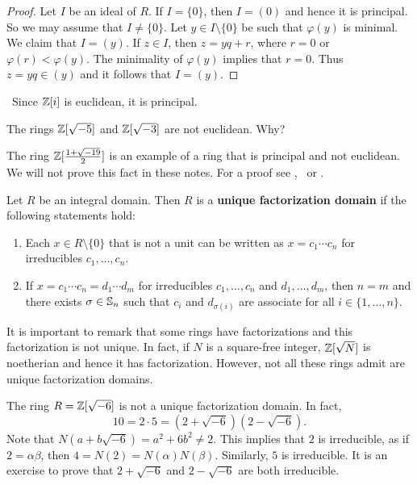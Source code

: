 \begin{proof}
	Let $I$ be an ideal of $R$. If $I=\{0\}$, then $I=(0)$ and hence 
	it is principal. So we may
	assume that $I\ne\{0\}$. Let $y\in I\setminus\{0\}$ be such that
	$\varphi(y)$ is minimal. We claim that $I=(y)$. 
	If $z\in I$, then $z=yq+r$, where $r=0$ or $\varphi(r)<\varphi(y)$. 
	The minimality of $\varphi(y)$ implies that $r=0$. Thus $z=yq\in (y)$ and 
	it follows that 
	$I=(y)$. 
\end{proof}

\begin{example}\
	Since $\mathbb{Z}[i]$ is euclidean, it is principal.
\end{example}
 
\begin{example}
	The rings $\mathbb{Z}[\sqrt{-5}]$ and $\mathbb{Z}[\sqrt{-3}]$ are
	not euclidean. Why?
\end{example}

The ring $\mathbb{Z}[\frac{1+\sqrt{-19}}{2}]$ is an 
example of a ring that is principal and not euclidean. We will not prove this
fact in these notes. For a proof 
see \cite{MR967349}, \cite{MR3665445} or \cite{MR314831}.

\begin{definition}
	Let $R$ be an integral domain. Then $R$ is a 
	\textbf{unique factorization domain}
	if the following statements hold:
	\begin{enumerate}
	\item Each $x\in R\setminus\{0\}$ that is not a unit can be written as $x=c_1\cdots c_n$ for irreducibles $c_1,\dots,c_n$. 
	\item If $x=c_1\cdots c_n=d_1\cdots d_m$ for irreducibles $c_1,\dots,c_n$ and $d_1,\dots,d_m$, then $n=m$ and there exists $\sigma\in\mathbb{S}_n$ such that $c_i$ and $d_{\sigma(i)}$ are
		associate for all $i\in\{1,\dots,n\}$. 
	\end{enumerate}
\end{definition}

It is important to remark that some rings 
have factorizations and this factorization is not unique. 
In fact, if $N$ is a square-free integer, $\mathbb{Z}[\sqrt{N}]$ is noetherian and hence it   
has factorization. 
However, not all these rings admit are unique factorization domains. 

\begin{example}
	The ring $R=\mathbb{Z}[\sqrt{-6}]$ is not a unique factorization domain. In fact,
	\[
	10=2\cdot 5=(2+\sqrt{-6})(2-\sqrt{-6}).
	\]	
	Note that $N(a+b\sqrt{-6})=a^2+6b^2\ne 2$. This implies that $2$ is irreducible, as 
	if $2=\alpha\beta$, then $4=N(2)=N(\alpha)N(\beta)$. 
	Similarly, $5$ is irreducible. It is an exercise to prove that 
	$2+\sqrt{-6}$ and $2-\sqrt{-6}$ are both irreducible. 
\end{example}

